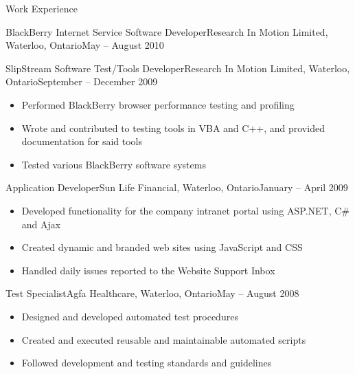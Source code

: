 \documentclass[11pt]{article}
\begin{document}
\begin{section}{Work Experience}
\begin{subsection}{BlackBerry Internet Service Software Developer}{Research In Motion Limited, Waterloo, Ontario}{May -- August 2010}
        \end{subsection}
        \begin{subsection}{SlipStream Software Test/Tools Developer}{Research In Motion Limited, Waterloo, Ontario}{September -- December 2009}

            \begin{itemize}
                \item Performed BlackBerry browser performance testing and profiling
                \item Wrote and contributed to testing tools in VBA and C++, and provided documentation for said tools
                \item Tested various BlackBerry software systems
            \end{itemize}

        \end{subsection}
        \begin{subsection}{Application Developer}{Sun Life Financial, Waterloo, Ontario}{January -- April 2009}

            \begin{itemize}
                \item Developed functionality for the company intranet portal using ASP.NET, C\# and Ajax
                \item Created dynamic and branded web sites using JavaScript and CSS
                \item Handled daily issues reported to the Website Support Inbox
            \end{itemize}

        \end{subsection}
        \begin{subsection}{Test Specialist}{Agfa Healthcare, Waterloo, Ontario}{May -- August 2008}

            \begin{itemize}
                \item Designed and developed automated test procedures
                \item Created and executed reusable and maintainable automated scripts
                \item Followed development and testing standards and guidelines
            \end{itemize}

        \end{subsection}

    \end{section}
\end{document}
